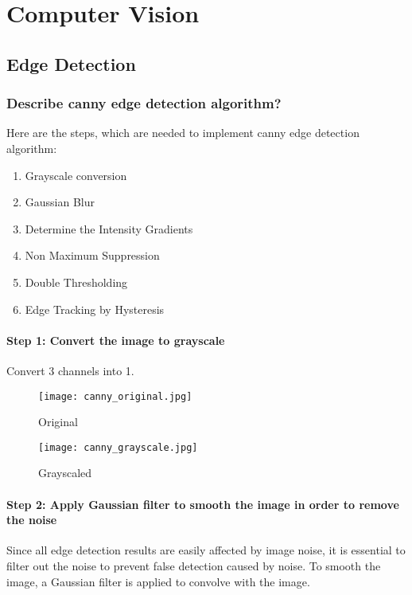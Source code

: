 \chapter{   Computer Vision}
\graphicspath{{./images/computer_vision/}}

\section{Edge Detection}

\subsection{Describe canny edge detection algorithm?}
Here are the steps, which are needed to implement canny edge detection algorithm:
\begin{enumerate}
    \item Grayscale conversion
    \item Gaussian Blur
    \item Determine the Intensity Gradients
    \item Non Maximum Suppression
    \item Double Thresholding
    \item Edge Tracking by Hysteresis
\end{enumerate}

\subsubsection{Step 1: Convert the image to grayscale}
Convert 3 channels into 1.

\begin{figure}[!htb]
    \centering
    \begin{minipage}{.5\textwidth}
        \centering
        \texttt{[image: canny\_original.jpg]}
        \caption{Original}
    \end{minipage}%
    \begin{minipage}{.5\textwidth}
        \centering
        \texttt{[image: canny\_grayscale.jpg]}
        \caption{Grayscaled}
    \end{minipage}
\end{figure}


\subsubsection{Step 2: Apply Gaussian filter to smooth the image in order to remove the noise}
Since all edge detection results are easily affected by image noise, it is essential to filter out the noise to prevent false detection caused by noise. To smooth the image, a Gaussian filter is applied to convolve with the image.

